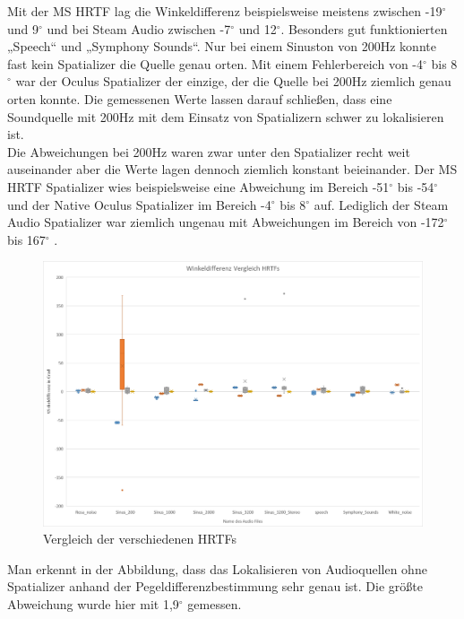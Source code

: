 \documentclass[12pt,a4paper]{article}
\begin{document}
Mit der MS HRTF lag die Winkeldifferenz beispielsweise meistens zwischen -19$^\circ$ und 9$^\circ$ und bei Steam Audio zwischen -7$^\circ$ und 12$^\circ$. Besonders gut funktionierten „Speech“ und „Symphony Sounds“. Nur bei einem Sinuston von 200Hz konnte fast kein  Spatializer die Quelle genau orten. Mit einem Fehlerbereich von -4$^\circ$ bis 8$^\circ$ war der Oculus Spatializer der einzige, der die Quelle bei 200Hz ziemlich genau orten konnte. Die gemessenen Werte lassen darauf schließen, dass eine Soundquelle mit 200Hz mit dem Einsatz von Spatializern schwer zu lokalisieren ist.\\
Die Abweichungen bei 200Hz waren zwar unter den Spatializer recht weit auseinander aber die Werte lagen dennoch ziemlich konstant beieinander. Der MS HRTF Spatializer wies beispielsweise eine Abweichung im Bereich -51$^\circ$ bis -54$^\circ$ und der Native Oculus Spatializer im Bereich -4$^\circ$ bis 8$^\circ$ auf. Lediglich der Steam Audio Spatializer war ziemlich ungenau mit Abweichungen im Bereich von -172$^\circ$ bis 167$^\circ$ .\\
\begin{figure}[!h]
\centering
\includegraphics[scale=0.4]{Vergleich_HRTFs}
\caption{Vergleich der verschiedenen HRTFs}
\end{figure}

Man erkennt in der Abbildung, dass das Lokalisieren von Audioquellen ohne Spatializer anhand der Pegeldifferenzbestimmung sehr genau ist. Die größte Abweichung wurde hier mit 1,9$^\circ$ gemessen.

\newpage

\nocite{*}


\end{document}
